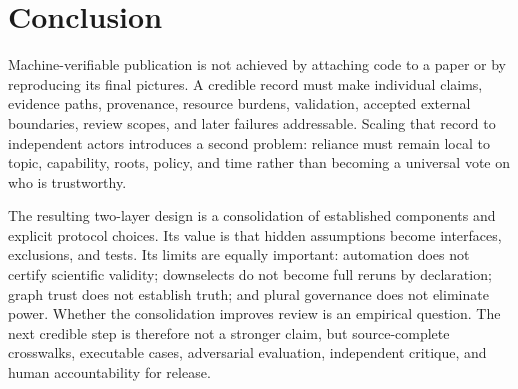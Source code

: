 \documentclass[11pt]{article}
\begin{document}
\section{Conclusion}

Machine-verifiable publication is not achieved by attaching code to a paper or by reproducing its final pictures. A credible record must make individual claims, evidence paths, provenance, resource burdens, validation, accepted external boundaries, review scopes, and later failures addressable. Scaling that record to independent actors introduces a second problem: reliance must remain local to topic, capability, roots, policy, and time rather than becoming a universal vote on who is trustworthy.

The resulting two-layer design is a consolidation of established components and explicit protocol choices. Its value is that hidden assumptions become interfaces, exclusions, and tests. Its limits are equally important: automation does not certify scientific validity; downselects do not become full reruns by declaration; graph trust does not establish truth; and plural governance does not eliminate power. Whether the consolidation improves review is an empirical question. The next credible step is therefore not a stronger claim, but source-complete crosswalks, executable cases, adversarial evaluation, independent critique, and human accountability for release.



\end{document}

